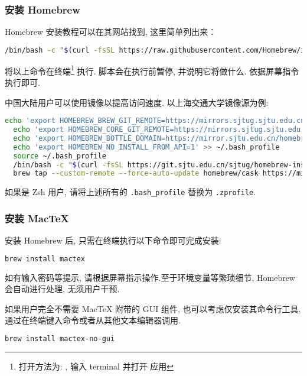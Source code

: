 \subsubsection{安装 Homebrew}
Homebrew 安装教程可以在其网站找到, 这里简单列出来：

\begin{lstlisting}[language=bash]
  /bin/bash -c "$(curl -fsSL https://raw.githubusercontent.com/Homebrew/install/HEAD/install.sh)"
\end{lstlisting}
将以上命令在\textsf{终端}\footnote{%
  打开方法为: \keys{\cmdmac + \SPACE}, 输入 \textsf{terminal} 并打开  应用}%
执行.
脚本会在执行前暂停, 并说明它将做什么. 依据屏幕指令执行即可.

中国大陆用户可以使用镜像以提高访问速度. 以上海交通大学镜像源为例:
\begin{lstlisting}[language=bash]
  echo 'export HOMEBREW_BREW_GIT_REMOTE=https://mirrors.sjtug.sjtu.edu.cn/git/brew.git' >> ~/.bash_profile
  echo 'export HOMEBREW_CORE_GIT_REMOTE=https://mirrors.sjtug.sjtu.edu.cn/git/homebrew-core.git' >> ~/.bash_profile
  echo 'export HOMEBREW_BOTTLE_DOMAIN=https://mirror.sjtu.edu.cn/homebrew-bottles/bottles' >> ~/.bash_profile
  echo 'export HOMEBREW_NO_INSTALL_FROM_API=1' >> ~/.bash_profile
  source ~/.bash_profile
  /bin/bash -c "$(curl -fsSL https://git.sjtu.edu.cn/sjtug/homebrew-install/-/raw/master/install.sh)"
  brew tap --custom-remote --force-auto-update homebrew/cask https://mirrors.sjtug.sjtu.edu.cn/git/homebrew-cask.git
\end{lstlisting}
如果是 Zsh 用户, 请将上述所有的 \texttt{.bash\_profile} 替换为 \texttt{.zprofile}.

\subsubsection{安装 Mac\TeX}

安装 Homebrew 后,
只需在\textsf{终端}执行以下命令即可完成安装:
\begin{lstlisting}[language=bash]
  brew install mactex
\end{lstlisting}
如有输入密码等提示, 请根据屏幕指示操作.至于环境变量等繁琐细节, Homebrew 会自动进行处理,
无须用户干预.

如果用户完全不需要 Mac\TeX{} 附带的 GUI 组件, 也可以考虑仅安装其命令行工具, 通过在终端键入命令或者从其他文本编辑器调用.
\begin{lstlisting}[language=bash]
  brew install mactex-no-gui
\end{lstlisting}

